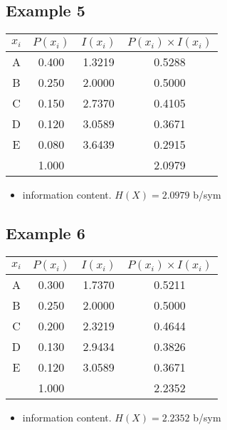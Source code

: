 \documentclass[12pt]{article}
\begin{document}
\subsection*{Example 5}
\begin{tabular}{|c|c|c|c|}
\hline
$x_i$	&	$P(x_i)$	&	$I(x_i)$	&	$P(x_i) \times I(x_i)$	\\ \hline	\hline
A	&	0.400	&	1.3219	&	0.5288	\\ \hline	
B	&	0.250	&	2.0000	&	0.5000	\\ \hline	
C	&	0.150	&	2.7370	&	0.4105	\\ \hline	
D	&	0.120	&	3.0589	&	0.3671	\\ \hline	
E	&	0.080	&	3.6439	&	0.2915	\\ \hline	
	&	1.000	&		&	2.0979	\\ \hline
\end{tabular} 
\begin{itemize}
\item information content. $H(X) = 2.0979 $ b/sym
\end{itemize}
\subsection*{Example 6}
\begin{tabular}{|c|c|c|c|}
\hline$x_i$	&	$P(x_i)$	&	$I(x_i)$	&	$P(x_i) \times I(x_i)$	\\ \hline	\hline
A	&	0.300	&	1.7370	&	0.5211	\\ \hline	
B	&	0.250	&	2.0000	&	0.5000	\\ \hline	
C	&	0.200	&	2.3219	&	0.4644	\\ \hline	
D	&	0.130	&	2.9434	&	0.3826	\\ \hline	
E	&	0.120	&	3.0589	&	0.3671	\\ \hline	
	&	1.000	&		&	2.2352	\\ \hline	
\end{tabular} 
\begin{itemize}
\item information content. $H(X) = 2.2352 $ b/sym
\end{itemize}
\newpage
\end{document}
